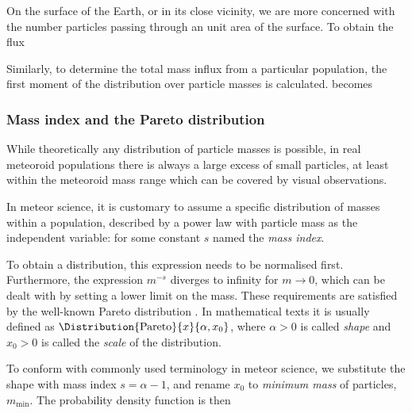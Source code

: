             On the surface of the Earth, or in its close vicinity, we are more concerned with
            the number particles passing through an unit area of the surface.
            To obtain the flux

            Similarly, to determine the total mass influx from a particular population, the first moment
            of the distribution over particle masses is calculated.
             becomes

        \subsubsection{Mass index and the Pareto distribution} \label{msms}
            While theoretically any distribution of particle masses is possible,
            in real meteoroid populations there is always a large excess of small particles,
            at least within the meteoroid mass range which can be covered by visual observations.

            In meteor science, it is customary to assume a specific distribution of masses within a population,
            described by a power law with particle mass as the independent variable:
            for some constant $s$ named the \emph{mass index}.

            To obtain a distribution, this expression needs to be normalised first.
            Furthermore, the expression $m^{-s}$ diverges to infinity for $m \to 0$,
            which can be dealt with by setting a lower limit on the mass.
            These requirements are satisfied by the well-known Pareto distribution \citep{arnold1983}.
            In mathematical texts it is usually defined as $\Distribution{\mathrm{Pareto}}{x}{\alpha, x_0}$,
            where $\alpha > 0$ is called \emph{shape} and $x_0 > 0$ is called the \emph{scale} of the distribution.

            To conform with commonly used terminology in meteor science, we substitute the shape with mass index
            $s = \alpha - 1$, and rename $x_0$ to \emph{minimum mass} of particles, $m_\mathrm{min}$.
            The probability density function is then


